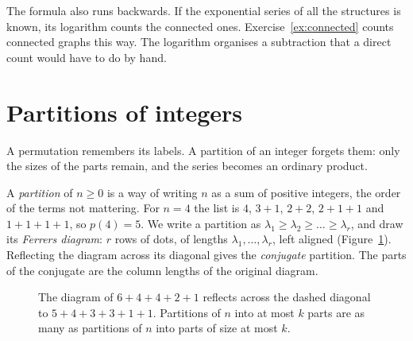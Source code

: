 The formula also runs backwards. If the exponential series of all the structures is known, its logarithm counts the connected ones. Exercise~\ref{ex:connected} counts connected graphs this way. The logarithm organises a subtraction that a direct count would have to do by hand.

\section{Partitions of integers}

A permutation remembers its labels. A partition of an integer forgets them: only the sizes of the parts remain, and the series becomes an ordinary product.

A \emph{partition} of $n\ge0$ is a way of writing $n$ as a sum of positive integers, the order of the terms not
mattering. For $n=4$ the list is $4$, $3+1$, $2+2$, $2+1+1$ and $1+1+1+1$, so $p(4)=5$. We write a partition as $\lambda_1\ge\lambda_2\ge\dots\ge\lambda_r$, and draw
its \emph{Ferrers diagram}: $r$ rows of dots, of lengths $\lambda_1,\dots,\lambda_r$, left aligned (Figure~\ref{fig:ferrers}).
Reflecting the diagram across its diagonal gives the \emph{conjugate} partition. The parts of the conjugate are the column lengths of the original diagram.

\begin{figure}[ht]
\centering
{}
\caption{The diagram of $6+4+4+2+1$ reflects across the dashed diagonal to $5+4+3+3+1+1$. Partitions of $n$ into at most $k$ parts are as many as partitions of $n$ into parts of size at most $k$.}
\label{fig:ferrers}
\end{figure}

